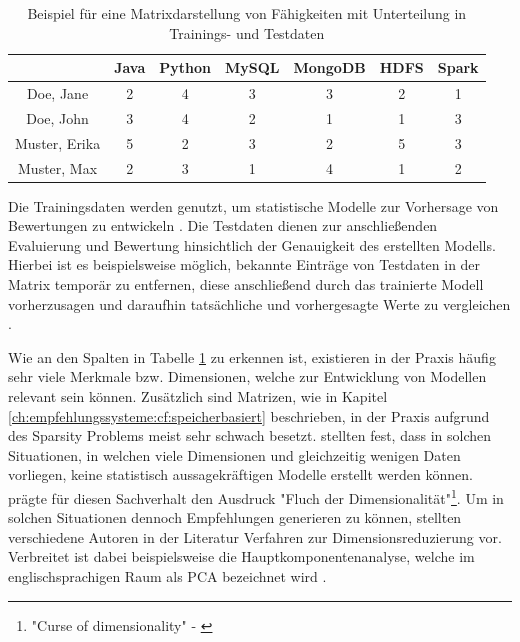 \begin{table}[h]
	\centering
	\begin{tabular}{c|c|c|c|c|c|c}
		& Java & Python & MySQL & MongoDB & HDFS & Spark\\ 
		\hline
		Doe, Jane 		& \cellcolor{itemcolor}2 & \cellcolor{usercolor}4 & \cellcolor{itemcolor}3 & \cellcolor{usercolor}3 & \cellcolor{itemcolor}2 & \cellcolor{usercolor}1\\
		Doe, John 		& \cellcolor{usercolor}3 & \cellcolor{itemcolor}4 & \cellcolor{usercolor}2 & \cellcolor{usercolor}1 & \cellcolor{usercolor}1 & \cellcolor{itemcolor}3\\
		Muster, Erika 	& \cellcolor{itemcolor}5 & \cellcolor{itemcolor}2 & \cellcolor{itemcolor}3 & \cellcolor{usercolor}2 & \cellcolor{usercolor}5 & \cellcolor{usercolor}3\\
		Muster, Max 	& \cellcolor{usercolor}2 & \cellcolor{usercolor}3 & \cellcolor{usercolor}1 & \cellcolor{itemcolor}4 & \cellcolor{usercolor}1 & \cellcolor{itemcolor}2
	\end{tabular}
	\caption{Beispiel für eine Matrixdarstellung von Fähigkeiten mit Unterteilung in Trainings- und Testdaten}
	\label{tbl:empfehlungssysteme:cf:modellbasiert:tbl1}
\end{table}

Die Trainingsdaten werden genutzt, um statistische Modelle zur Vorhersage von Bewertungen zu entwickeln \cite[S. 71f.]{recommenderSystems:2016}. Die Testdaten dienen zur anschließenden Evaluierung und Bewertung hinsichtlich der Genauigkeit des erstellten Modells. Hierbei ist es beispielsweise möglich, bekannte Einträge von Testdaten in der Matrix temporär zu entfernen, diese anschließend durch das trainierte Modell vorherzusagen und daraufhin tatsächliche und vorhergesagte Werte zu vergleichen \cite[S. 3ff.]{kang:2016}.

Wie an den Spalten in Tabelle \ref{tbl:empfehlungssysteme:cf:modellbasiert:tbl1} zu erkennen ist, existieren in der Praxis häufig sehr viele Merkmale bzw. Dimensionen, welche zur Entwicklung von Modellen relevant sein können. Zusätzlich sind Matrizen, wie in Kapitel \ref{ch:empfehlungssysteme:cf:speicherbasiert} beschrieben, in der Praxis aufgrund des Sparsity Problems meist sehr schwach besetzt. \textcite[S. 1]{boratto:2014} stellten fest, dass in solchen Situationen, in welchen viele Dimensionen und gleichzeitig wenigen Daten vorliegen, keine statistisch aussagekräftigen Modelle erstellt werden können. \textcite[S. 94]{bellman:1961} prägte für diesen Sachverhalt den Ausdruck "Fluch der Dimensionalität"\footnote{"Curse of dimensionality" - \textcite[S. 94]{bellman:1961}}. Um in solchen Situationen dennoch Empfehlungen generieren zu können, stellten verschiedene Autoren in der Literatur Verfahren zur Dimensionsreduzierung vor. Verbreitet ist dabei beispielsweise die Hauptkomponentenanalyse, welche im englischsprachigen Raum als \ac{PCA} bezeichnet wird \cite[S. 1ff.]{vaswani:2018}.

